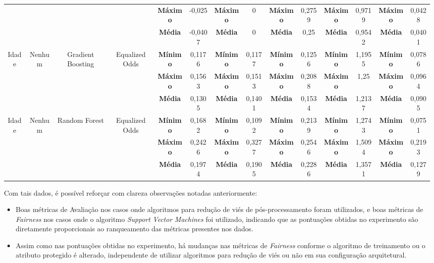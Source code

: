 \documentclass[Portugues,Final]{ic-tese-v3}
\begin{document}
\begin{table}[H]
\begin{center}
{\begin{tabular}{c|c|c|c|c|c|c|c|c|c|c|c|c|c}
             & & & & \textbf{Máximo} & -0,025 & \textbf{Máximo} & 0 & \textbf{Máximo} & 0,2759 & \textbf{Máximo} & 0,9719 & \textbf{Máximo} & 0,0428 \\
             & & & & \textbf{Média} & -0,0407 & \textbf{Média} & 0 & \textbf{Média} & 0,25 & \textbf{Média} & 0,9542 & \textbf{Média} & 0,0401 \\
            \hline
            \multirow{3}{*}{Idade} & \multirow{3}{*}{Nenhum} & \multirow{3}{*}{Gradient Boosting} & \multirow{3}{*}{Equalized Odds} & \textbf{Mínimo} & 0,1176 & \textbf{Mínimo} & 0,1177 & \textbf{Mínimo} & 0,1256 & \textbf{Mínimo} & 1,1955 & \textbf{Mínimo} & 0,0786 \\
             & & & & \textbf{Máximo} & 0,1563 & \textbf{Máximo} & 0,1513 & \textbf{Máximo} & 0,2088 & \textbf{Máximo} & 1,25 & \textbf{Máximo} & 0,0964 \\
             & & & & \textbf{Média} & 0,1305 & \textbf{Média} & 0,1401 & \textbf{Média} & 0,1534 & \textbf{Média} & 1,2137 & \textbf{Média} & 0,0905 \\
            \hline
            \multirow{3}{*}{Idade} & \multirow{3}{*}{Nenhum} & \multirow{3}{*}{Random Forest} & \multirow{3}{*}{Equalized Odds} & \textbf{Mínimo} & 0,1682 & \textbf{Mínimo} & 0,1092 & \textbf{Mínimo} & 0,2139 & \textbf{Mínimo} & 1,2743 & \textbf{Mínimo} & 0,0751 \\
             & & & & \textbf{Máximo} & 0,2426 & \textbf{Máximo} & 0,3277 & \textbf{Máximo} & 0,2546 & \textbf{Máximo} & 1,5094 & \textbf{Máximo} & 0,2193 \\
             & & & & \textbf{Média} & 0,1974 & \textbf{Média} & 0,1905 & \textbf{Média} & 0,2286 & \textbf{Média} & 1,3571 & \textbf{Média} & 0,1279 \\
            \end{tabular}}
        \end{center}
    \end{table}

Com tais dados, é possível reforçar com clareza observações notadas anteriormente:

\begin{itemize}
\item Boas métricas de Avaliação nos casos onde algoritmos para redução de viés de pós-processamento foram utilizados, e boas métricas de \textit{Fairness} nos casos onde o algoritmo \textit{Support Vector Machines} foi utilizado, indicando que as pontuações obtidas no experimento são diretamente proporcionais ao ranqueamento das métricas presentes nos dados.
\item Assim como nas pontuações obtidas no experimento, há mudanças nas métricas de \textit{Fairness} conforme o algoritmo de treinamento ou o atributo protegido é alterado, independente de utilizar algoritmos para redução de viés ou não em sua configuração arquitetural.
\end{itemize}
\end{document}

